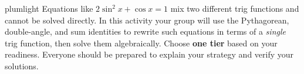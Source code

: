 \documentclass[10pt]{article}
\begin{document}
\namepartnerperiod

\vspace{0.10in}

\begin{scenariobox}{plumlight}
Equations like $2\sin^2 x + \cos x = 1$ mix two different trig functions and
cannot be solved directly. In this activity your group will use the Pythagorean,
double-angle, and sum identities to rewrite such equations in terms of a
\emph{single} trig function, then solve them algebraically.
Choose \textbf{one tier} based on your readiness. Everyone should be prepared
to explain your strategy and verify your solutions.
\end{scenariobox}

\vspace{0.08in}
\end{document}
